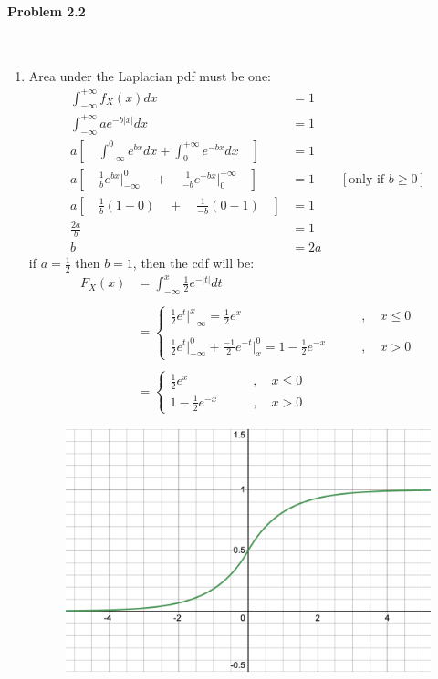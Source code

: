 \documentclass[12pt, letterpaper]{scrartcl}
\begin{document}
\paragraph*{Problem 2.2} \hfill\\
\begin{enumerate}[((a))]
    \item Area under the Laplacian pdf must be one:
    \begin{align*}
        \int^{+\infty}_{-\infty}f_X(x)dx&=1\\
        \int^{+\infty}_{-\infty}ae^{-b|x|}dx&=1\\
        a[\quad\int^{0}_{-\infty}e^{bx}dx+\int^{+\infty}_{0}e^{-bx}dx\quad]&=1\\
        a[\quad\frac{1}{b}e^{bx}\bigg\rvert^{0}_{-\infty}\quad+\quad\frac{1}{-b}e^{-bx}\bigg\rvert^{+\infty}_{0}\quad]&=1\qquad[\text{only if }b\geq0]\\
        a[\quad\frac{1}{b}(1-0)\quad+\quad\frac{1}{-b}(0-1)\quad]&=1\\
        \frac{2a}{b}&=1\\
        b&=2a
    \end{align*}
    if $a=\frac{1}{2}$ then $b=1$, then the cdf will be:
    \begin{align*}
        F_X(x)&=\int_{-\infty}^{x}\frac{1}{2}e^{-|t|}dt\\\\
        &=
        \begin{cases}
         \frac{1}{2}e^{t}\bigg\rvert^{x}_{-\infty}=\frac{1}{2}e^{x} & \qquad ,\quad x\leq 0\\\\ 
         \frac{1}{2}e^{t}\bigg\rvert^{0}_{-\infty}+\frac{-1}{2}e^{-t}\bigg\rvert^{0}_{x}=1-\frac{1}{2}e^{-x} & \qquad ,\quad x > 0
        \end{cases}\\\\
        &=
        \begin{cases}
         \frac{1}{2}e^{x} & \qquad ,\quad x\leq 0\\
         1-\frac{1}{2}e^{-x} & \qquad ,\quad x > 0
        \end{cases}
    \end{align*}
    \begin{figure}[H]
        \includegraphics[width=0.7\linewidth]{hw2_figures/2.2a.png}

\end{figure}
\end{enumerate}
\end{document}
